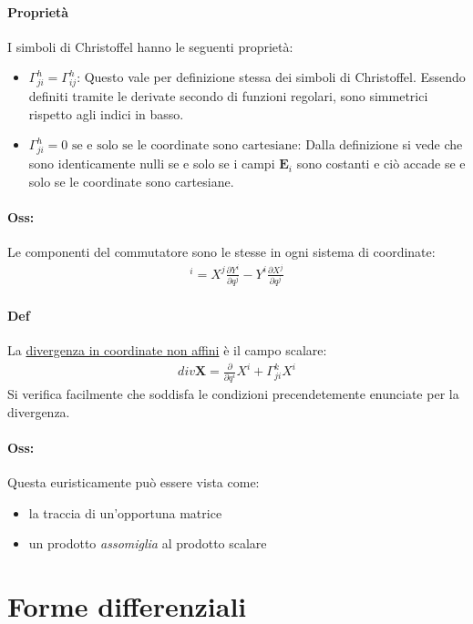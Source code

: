 \paragraph{Proprietà} I simboli di Christoffel hanno le seguenti proprietà:
\begin{itemize}
    \item $\boxed{\Gamma^h_{ji}=\Gamma^h_{ij}}$: Questo vale per definizione stessa dei simboli di Christoffel. Essendo definiti tramite le derivate secondo di funzioni regolari, sono simmetrici rispetto agli indici in basso.
    \item $\boxed{\Gamma^h_{ji}=0\text{ se e solo se le coordinate sono cartesiane}}$: Dalla definizione si vede che sono identicamente nulli se e solo se i campi $\mathbf{E}_i$ sono costanti e ciò accade se e solo se le coordinate sono cartesiane.
\end{itemize}
\paragraph{Oss:} Le componenti del commutatore sono le stesse in ogni sistema di coordinate:
\begin{align*}
    [\mathbf{X},\mathbf{Y}]^i=X^j\frac{\partial Y^i}{\partial q^j}-Y^i\frac{\partial X^j}{\partial q^j}
\end{align*}
\paragraph{Def} La \underline{divergenza in coordinate non affini} è il campo scalare:
\begin{align*}
    div\mathbf{X}=\frac{\partial}{\partial q^i}X^i+\Gamma^k_{ji}X^i
\end{align*}
Si verifica facilmente che soddisfa le condizioni precendetemente enunciate per la divergenza.
\paragraph{Oss:} Questa euristicamente può essere vista come:
\begin{itemize}
    \item la traccia di un'opportuna matrice
    \item un prodotto \textit{assomiglia} al prodotto scalare
\end{itemize}

\section{Forme differenziali}
